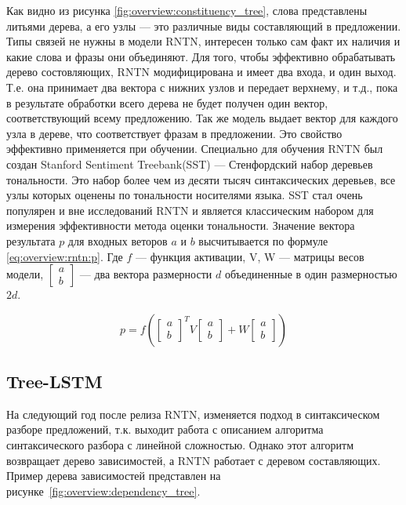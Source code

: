 Как видно из рисунка \ref{fig:overview:constituency_tree}, слова представлены литьями дерева, а его узлы --- это различные виды составляющий в предложении. Типы связей не нужны в модели RNTN, интересен только сам факт их наличия и какие слова и фразы они объединяют. Для того, чтобы эффективно обрабатывать дерево состовляющих, RNTN модифицирована и имеет два входа, и один выход. Т.е. она принимает два вектора с нижних узлов и передает верхнему, и т.д., пока в результате обработки всего дерева не будет получен один вектор, соответствующий всему предложению. Так же модель выдает вектор для каждого узла в дереве, что соответствует фразам в предложении. Это свойство эффективно применяется при обучении. Специально для обучения RNTN был создан Stanford Sentiment Treebank(SST) --- Стенфордский набор деревьев тональности. Это набор более чем из десяти тысяч синтаксических деревьев, все узлы которых оценены по тональности носителями языка. SST стал очень популярен и вне исследований RNTN и является классическим набором для измерения эффективности метода оценки тональности.
Значение вектора результата $p$ для входных веторов $a$ и $b$ высчитывается по формуле \ref{eq:overview:rntn:p}. Где $f$ --- функция активации, V, W --- матрицы весов модели, $\begin{bmatrix}a\\b\end{bmatrix}$ --- два вектора размерности $d$ объединенные в один размерностью $2d$.

\begin{equation}
  \label{eq:overview:rntn:p}
  p = f(
  \begin{bmatrix}
    a\\
    b
  \end{bmatrix}^TV
  \begin{bmatrix}
    a\\
    b
  \end{bmatrix} + W
  \begin{bmatrix}
    a\\
    b
  \end{bmatrix})
\end{equation}

\subsection{Tree-LSTM}
На следующий год после релиза RNTN, изменяется подход в синтаксическом разборе предложений, т.к. выходит работа с описанием алгоритма синтаксического разбора с линейной сложностью. Однако этот алгоритм возвращает дерево зависимостей, а RNTN работает с деревом составляющих. Пример дерева зависимостей представлен на рисунке~\ref{fig:overview:dependency_tree}.

